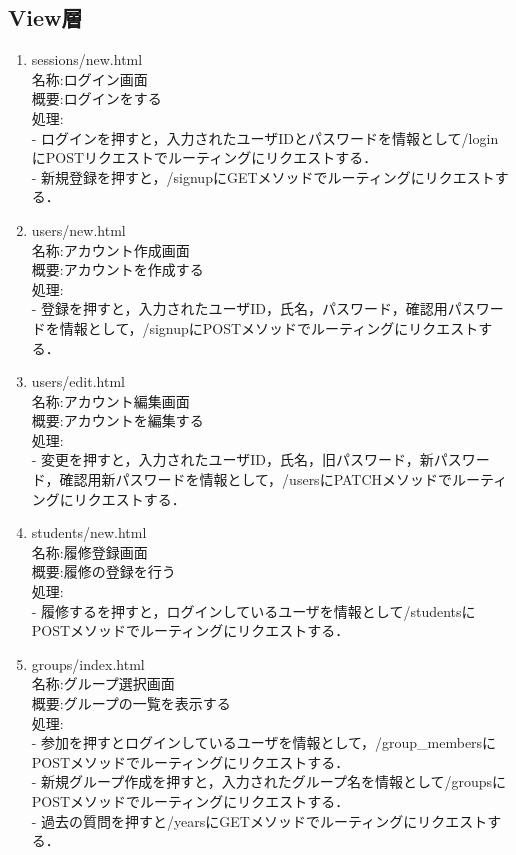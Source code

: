 \newpage

\subsection{View層}
\begin{enumerate}


\item  sessions/new.html \\
名称:ログイン画面 \\
概要:ログインをする\\
処理:\\
- ログインを押すと，入力されたユーザIDとパスワードを情報として/loginにPOSTリクエストでルーティングにリクエストする．\\
- 新規登録を押すと，/signupにGETメソッドでルーティングにリクエストする．\\

\item  users/new.html \\
名称:アカウント作成画面 \\
概要:アカウントを作成する \\
処理:\\
- 登録を押すと，入力されたユーザID，氏名，パスワード，確認用パスワードを情報として，/signupにPOSTメソッドでルーティングにリクエストする．

\item  users/edit.html \\
名称:アカウント編集画面 \\
概要:アカウントを編集する \\
処理:\\
- 変更を押すと，入力されたユーザID，氏名，旧パスワード，新パスワード，確認用新パスワードを情報として，/usersにPATCHメソッドでルーティングにリクエストする．

\item  students/new.html \\
名称:履修登録画面 \\
概要:履修の登録を行う \\
処理:\\
- 履修するを押すと，ログインしているユーザを情報として/studentsにPOSTメソッドでルーティングにリクエストする．

\item  groups/index.html\\
名称:グループ選択画面 \\
概要:グループの一覧を表示する \\
処理:\\
- 参加を押すとログインしているユーザを情報として，/group\_membersにPOSTメソッドでルーティングにリクエストする．\\
- 新規グループ作成を押すと，入力されたグループ名を情報として/groupsにPOSTメソッドでルーティングにリクエストする．\\
- 過去の質問を押すと/yearsにGETメソッドでルーティングにリクエストする．


\end{enumerate}

